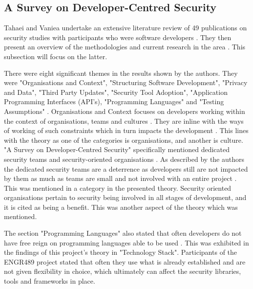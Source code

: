 \subsection{A Survey on Developer-Centred Security}

\par Tahaei and Vaniea undertake an extensive literature review of 49 publications on security studies with participants who were software developers \cite{dev}. They then present an overview of the methodologies and current research in the area \cite{dev}. This subsection will focus on the latter. 
\newline
\par 
There were eight significant themes in the results shown by the authors. They were "Organisations and Context", "Structuring Software Development", "Privacy and Data", "Third Party Updates", "Security Tool Adoption", "Application Programming Interfaces (API's), "Programming Languages" and "Testing Assumptions" \cite{dev}. Organisations and Context focuses on developers working within the context of organisations, teams and cultures \cite{dev}. They are inline with the ways of working of such constraints which in turn impacts the development \cite{dev}. This lines with the theory as one of the categories is organisations, and another is culture. "A Survey on Developer-Centred Security" specifically mentioned dedicated security teams and security-oriented organisations \cite{dev}. As described by the authors the dedicated security teams are a deterrence as developers still are not impacted by them as much as teams are small and not involved with an entire project \cite{dev}. This was mentioned in a category in the presented theory. Security oriented organisations pertain to security being involved in all stages of development, and it is cited as being a benefit. This was another aspect of the theory which was mentioned. 
\newline
\par 
The section "Programming Languages" also stated that often developers do not have free reign on programming languages able to be used \cite{dev}. This was exhibited in the findings of this project's theory in "Technology Stack". Participants of the ENGR489 project stated that often they use what is already established and are not given flexibility in choice, which ultimately can affect the security libraries, tools and frameworks in place. 
